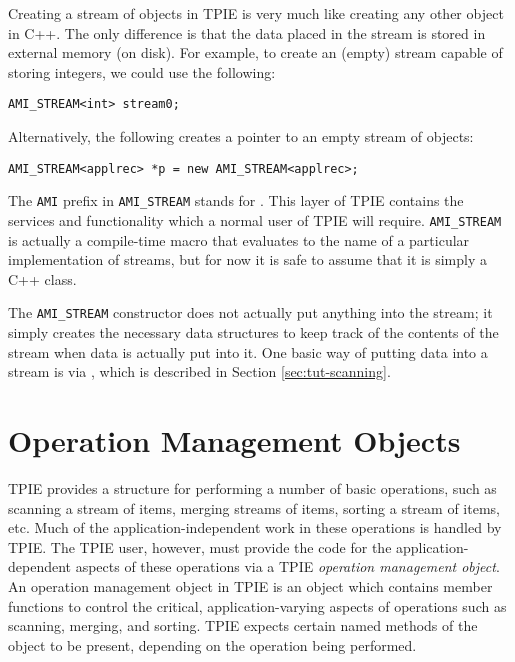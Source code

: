 Creating a stream of objects in TPIE is very much like
creating any other object in C++. The only difference is
that the data placed in the stream is stored in external
memory (on disk). 
For example, to create an (empty) stream 
capable of storing integers, we could use the following:
\begin{verbatim}
AMI_STREAM<int> stream0;
\end{verbatim}
Alternatively, the following creates a pointer
 to an empty stream of  objects:
\begin{verbatim}
AMI_STREAM<applrec> *p = new AMI_STREAM<applrec>;
\end{verbatim}

The {\tt AMI} prefix in {\tt AMI\_STREAM} stands for
. This layer of TPIE contains the
services and functionality which a normal user of TPIE will
require.  {\tt AMI\_STREAM} is actually a compile-time macro
that evaluates to the name of a particular implementation of
streams, but for now it is safe to assume that it is simply
a C++ class.

The {\tt AMI\_STREAM} constructor does not actually put
anything into the stream; it simply creates the necessary
data structures to keep track of the contents of the stream
when data is actually put into it.  One basic way of putting
data into a stream is via , which is
described in Section \ref{sec:tut-scanning}.

\section{Operation Management Objects} 

TPIE provides a structure for performing a number of basic
operations, such as scanning a stream of items, merging
streams of items, sorting a stream of items, etc. Much of
the application-independent work in these operations is
handled by TPIE. The TPIE user, however, must provide the
code for the application-dependent aspects of these
operations via a TPIE {\em operation management object}. An
operation management object in TPIE is an object which
contains member functions to control the critical,
application-varying aspects of operations such as scanning,
merging, and sorting. TPIE expects certain named methods of
the object to be present, depending on the operation being
performed. 


